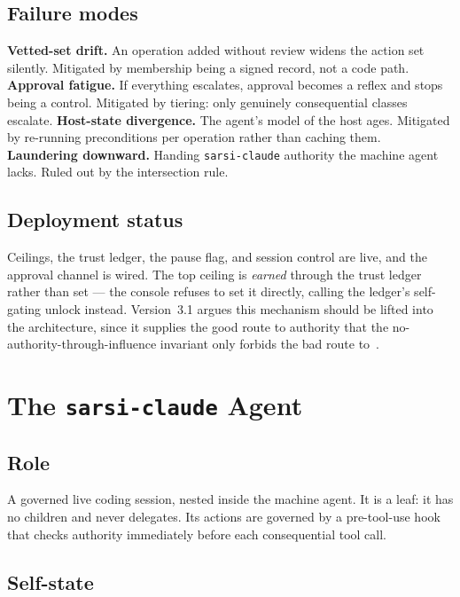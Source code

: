 \documentclass[11pt]{article}
\newcommand{\code}[1]{\texttt{\small #1}}
\begin{document}
\subsection{Failure modes}

\textbf{Vetted-set drift.} An operation added without review widens the action set silently. Mitigated by membership being a signed record, not a code path.
\textbf{Approval fatigue.} If everything escalates, approval becomes a reflex and stops being a control. Mitigated by tiering: only genuinely consequential classes escalate.
\textbf{Host-state divergence.} The agent's model of the host ages. Mitigated by re-running preconditions per operation rather than caching them.
\textbf{Laundering downward.} Handing \code{sarsi-claude} authority the machine agent lacks. Ruled out by the intersection rule.

\subsection{Deployment status}

Ceilings, the trust ledger, the pause flag, and session control are live, and the approval channel is wired. The top ceiling is \emph{earned} through the trust ledger rather than set --- the console refuses to set it directly, calling the ledger's self-gating unlock instead. Version~3.1 argues this mechanism should be lifted into the architecture, since it supplies the good route to authority that the no-authority-through-influence invariant only forbids the bad route to~\citep{yang2026v31}.

\section{The \texttt{sarsi-claude} Agent}
\label{sec:claude}

\subsection{Role}

A governed live coding session, nested inside the machine agent. It is a leaf: it has no children and never delegates. Its actions are governed by a pre-tool-use hook that checks authority immediately before each consequential tool call.

\subsection{Self-state}
\end{document}
